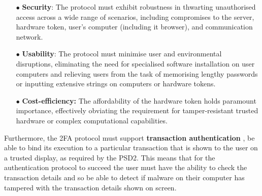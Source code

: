 \begin{itemize}[leftmargin=4.6mm]

\item[$\bullet$]\textbf{Security}: The protocol must exhibit robustness in thwarting unauthorised access across a wide range of scenarios, including compromises to the server, hardware token, user's computer (including it browser), and communication network.



\item[$\bullet$]\textbf{Usability}: The protocol must minimise user and environmental disruptions, eliminating the need for specialised software installation on user computers and relieving users from the task of memorising lengthy passwords or inputting extensive strings on computers or hardware tokens.

%

\item[$\bullet$]\textbf{Cost-efficiency:} The affordability of the hardware token holds paramount importance, effectively obviating the requirement for tamper-resistant trusted hardware or complex computational capabilities.



\end{itemize}

Furthermore, the 2FA protocol must support \textbf{transaction authentication} \ie, be able to bind its execution to a particular transaction that is shown to the user on a trusted display, as required by the PSD2.
This means that for the authentication protocol to succeed the user must have the ability to check the transaction details and so be able to detect if malware on their computer has tampered with the transaction details shown on screen.



